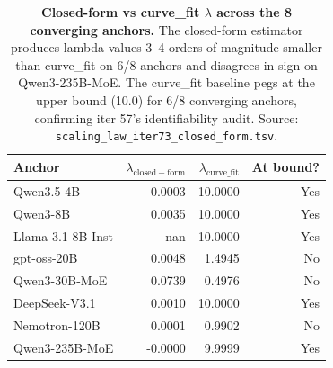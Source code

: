 \begin{table}[t]
  \centering
  \small
  \begin{tabular}{lrrr}
    \toprule
    Anchor & $\lambda_\mathrm{closed-form}$ & $\lambda_\mathrm{curve\_fit}$ & At bound? \\
    \midrule
      Qwen3.5-4B            & 0.0003 & 10.0000 & Yes \\
      Qwen3-8B              & 0.0035 & 10.0000 & Yes \\
      Llama-3.1-8B-Inst     & nan    & 10.0000 & Yes \\
      gpt-oss-20B           & 0.0048 &  1.4945 & No \\
      Qwen3-30B-MoE         & 0.0739 &  0.4976 & No \\
      DeepSeek-V3.1         & 0.0010 & 10.0000 & Yes \\
      Nemotron-120B         & 0.0001 &  0.9902 & No \\
      Qwen3-235B-MoE        & -0.0000&  9.9999 & Yes \\
    \bottomrule
  \end{tabular}
\caption{\textbf{Closed-form vs curve\_fit $\lambda$ across the
    8 converging anchors.}  The closed-form estimator produces
    lambda values 3--4 orders of magnitude smaller than curve\_fit
    on 6/8 anchors and disagrees in sign on Qwen3-235B-MoE.  The
    curve\_fit baseline pegs at the upper bound (10.0) for 6/8
    converging anchors, confirming iter 57's identifiability
    audit.  Source: \texttt{scaling\_law\_iter73\_closed\_form.tsv}.}
  \label{tab:iter73-cf}
\end{table}

